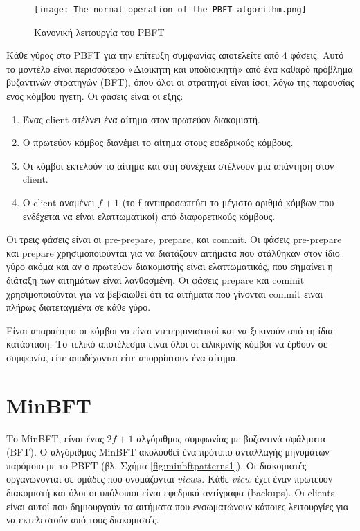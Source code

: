 \begin{figure}[H]
\centering
  \texttt{[image: The-normal-operation-of-the-PBFT-algorithm.png]}
  \caption{Κανονική λειτουργία του PBFT }
  \label{fig:pbft_normal}
\end{figure}

Κάθε γύρος στο PBFT για την επίτευξη συμφωνίας αποτελείτε από 4 φάσεις. Αυτό το μοντέλο είναι περισσότερο «Διοικητή και υποδιοικητή» από ένα καθαρό πρόβλημα βυζαντινών στρατηγών (BFT), όπου όλοι οι στρατηγοί είναι ίσοι, λόγω της παρουσίας ενός κόμβου ηγέτη. Οι φάσεις είναι οι εξής:
\begin{enumerate}
\item Ένας client στέλνει ένα αίτημα στον πρωτεύον διακομιστή.
\item Ο πρωτεύον κόμβος διανέμει το αίτημα στους εφεδρικούς κόμβους.
\item Οι κόμβοι εκτελούν το αίτημα και στη συνέχεια στέλνουν μια απάντηση στον client.
\item Ο client αναμένει $f + 1$ (το f αντιπροσωπεύει το μέγιστο αριθμό κόμβων που ενδέχεται να είναι ελαττωματικοί) από διαφορετικούς κόμβους. 
\end{enumerate}

Οι τρεις φάσεις είναι οι pre-prepare, prepare, και commit. Οι φάσεις pre-prepare και prepare χρησιμοποιούνται για να διατάξουν αιτήματα που στάλθηκαν στον ίδιο γύρο ακόμα και αν ο πρωτεύων διακομιστής είναι ελαττωματικός, που σημαίνει η διάταξη των αιτημάτων είναι λανθασμένη. Οι φάσεις prepare και commit χρησιμοποιούνται για να βεβαιωθεί ότι τα αιτήματα που γίνονται commit είναι πλήρως διατεταγμένα σε κάθε γύρο.

Είναι απαραίτητο οι κόμβοι να είναι ντετερμινιστικοί και να ξεκινούν από τη ίδια κατάσταση. Το τελικό αποτέλεσμα είναι όλοι οι ειλικρινής κόμβοι να έρθουν σε συμφωνία, είτε αποδέχονται είτε απορρίπτουν ένα αίτημα.

\section{MinBFT} \label{minbftSection}
Το MinBFT, είναι ένας $2f + 1$ αλγόριθμος συμφωνίας με βυζαντινά σφάλματα (BFT). O αλγόριθμος MinBFT ακολουθεί ένα πρότυπο ανταλλαγής μηνυμάτων παρόμοιο με το PBFT (βλ. Σχήμα \ref{fig:minbftpatterns1}). Οι διακομιστές οργανώνονται σε ομάδες που ονομάζονται $views$. Κάθε $view$ έχει έναν πρωτεύον διακομιστή και όλοι οι υπόλοιποι είναι εφεδρικά αντίγραφα (backups). Οι clients είναι αυτοί που δημιουργούν τα αιτήματα που ενσωματώνουν κάποιες λειτουργίες για να εκτελεστούν από τους διακομιστές.

